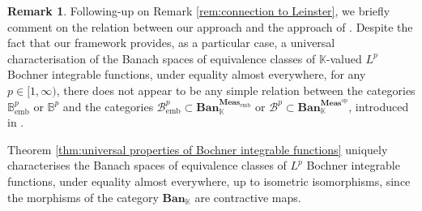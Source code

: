 \documentclass{amsart}
\theoremstyle{definition}
\newtheorem{remark}[definition]{Remark}
\theoremstyle{plain}
\newcommand{\K}{\mathbb{K}}
\newcommand{\opMeas}{\mathbf{Meas}^\mathrm{op}}
\newcommand{\embMeas}{\mathbf{Meas}_\mathrm{emb}}
\newcommand{\Ban}{\mathbf{Ban}_{\mathbb{K}}}
\newcommand{\Bembp}{\mathbb{B}_{\mathrm{emb}}^p}
\newcommand{\Bp}{\mathbb{B}^p}
\begin{document}
        \begin{remark}
            Following-up on Remark \ref{rem:connection to Leinster}, we briefly comment on the relation between our approach and the approach of \cite{Leinster2023}.
            Despite the fact that our framework provides, as a particular case, a universal characterisation of the Banach spaces of equivalence classes of $\K$-valued $L^p$ Bochner integrable functions, under equality almost everywhere, for any $p \in [1,\infty)$, there does not appear to be any simple relation between the categories $\Bembp$ or $\Bp$ and the categories $\mathscr{B}_{\mathrm{emb}}^p \subset \Ban^{\embMeas}$ or $\mathscr{B}^p \subset \Ban^{\opMeas}$, introduced in \cite[\S3]{Leinster2023}.  
        \end{remark}

        Theorem \ref{thm:universal properties of Bochner integrable functions} uniquely characterises the Banach spaces of equivalence classes of $L^p$ Bochner integrable functions, under equality almost everywhere, up to isometric isomorphisms, since the morphisms of the category $\Ban$ are contractive maps.
\end{document}
